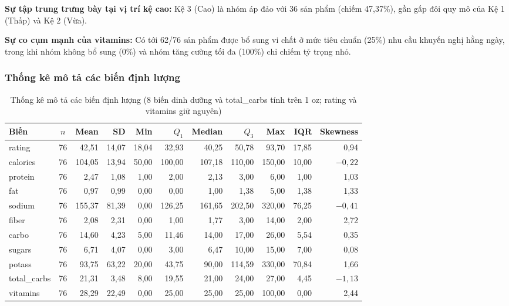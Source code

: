 \documentclass[12pt,a4paper]{article}
\begin{document}
\textbf{Sự tập trung trưng bày tại vị trí kệ cao:} Kệ 3 (Cao) là nhóm áp đảo với 36 sản
phẩm (chiếm 47,37\%), gần gấp đôi quy mô của Kệ 1 (Thấp) và Kệ 2 (Vừa).

\textbf{Sự co cụm mạnh của vitamins:} Có tới 62/76 sản phẩm được bổ sung vi chất ở mức
tiêu chuẩn (25\%) nhu cầu khuyến nghị hằng ngày, trong khi nhóm không bổ sung (0\%) và nhóm
tăng cường tối đa (100\%) chỉ chiếm tỷ trọng nhỏ.

\subsubsection{Thống kê mô tả các biến định lượng}

\begin{table}[H]
\centering
\caption{Thống kê mô tả các biến định lượng (8 biến dinh dưỡng và total\_carbs tính trên 1 oz; rating và vitamins giữ nguyên)}
\label{tab:dinhluong}
\small
\setlength{\tabcolsep}{4pt}
\begin{tabular}{l c r r r r r r r r r}
\toprule
Biến & $n$ & Mean & SD & Min & $Q_1$ & Median & $Q_3$ & Max & IQR & Skewness \\
\midrule
rating      & 76 & 42,51  & 14,07 & 18,04 & 32,93  & 40,25  & 50,78  & 93,70  & 17,85 & 0,94 \\
calories    & 76 & 104,05 & 13,94 & 50,00 & 100,00 & 107,18 & 110,00 & 150,00 & 10,00 & $-0{,}22$ \\
protein     & 76 & 2,47   & 1,08  & 1,00  & 2,00   & 2,13   & 3,00   & 6,00   & 1,00  & 1,03 \\
fat         & 76 & 0,97   & 0,99  & 0,00  & 0,00   & 1,00   & 1,38   & 5,00   & 1,38  & 1,33 \\
sodium      & 76 & 155,37 & 81,39 & 0,00  & 126,25 & 161,65 & 202,50 & 320,00 & 76,25 & $-0{,}41$ \\
fiber       & 76 & 2,08   & 2,31  & 0,00  & 1,00   & 1,77   & 3,00   & 14,00  & 2,00  & 2,72 \\
carbo       & 76 & 14,60  & 4,23  & 5,00  & 11,46  & 14,00  & 17,00  & 26,00  & 5,54  & 0,35 \\
sugars      & 76 & 6,71   & 4,07  & 0,00  & 3,00   & 6,47   & 10,00  & 15,00  & 7,00  & 0,08 \\
potass      & 76 & 93,75  & 63,22 & 20,00 & 43,75  & 90,00  & 114,59 & 330,00 & 70,84 & 1,66 \\
total\_carbs & 76 & 21,31 & 3,48  & 8,00  & 19,55  & 21,00  & 24,00  & 27,00  & 4,45  & $-1{,}13$ \\
vitamins    & 76 & 28,29  & 22,49 & 0,00  & 25,00  & 25,00  & 25,00  & 100,00 & 0,00  & 2,44 \\
\bottomrule
\end{tabular}
\end{table}
\end{document}
